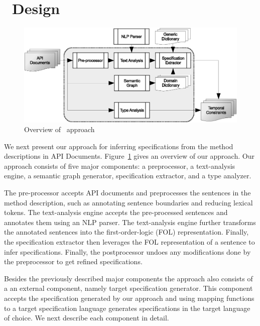 \section{\tool\ Design}
\label{sec:approach}

\begin{figure}
	\centering
		\includegraphics[scale=0.45]{approach.eps}
	\caption{Overview of \tool\ approach}
	\label{fig:approachOverview}
\end{figure}

We next present our approach for inferring specifications from the method descriptions in API Documents.
Figure~\ref{fig:approachOverview} gives an overview of our approach.
Our approach consists of five major components: a preprocessor, a text-analysis engine, a semantic graph generator, specification extractor, and a type analyzer.

The pre-processor accepts API documents and preprocesses the sentences in the method description, such as annotating sentence boundaries and reducing lexical tokens.
The text-analysis engine accepts the pre-processed sentences and annotates them using an NLP parser.
The text-analysis engine further transforms the annotated sentences into the first-order-logic (FOL) representation.
Finally, the specification extractor then leverages the FOL representation of a sentence to infer specifications.
Finally, the postprocessor undoes any modifications done by the preprocessor to get refined specifications.

Besides the previously described major components the approach also consists of a an external component, namely target specification generator.
This component accepts the specification generated by our approach and using mapping functions to a target specification language generates specifications in the target language of choice.
We next describe each component in detail.


